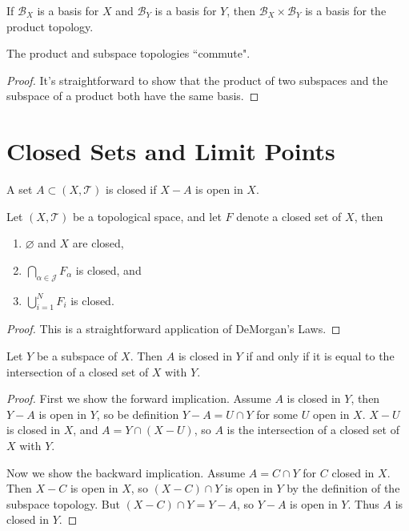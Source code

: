 \documentclass[10pt]{report}
\begin{document}
\begin{prop}
If $\mathcal{B}_X$ is a basis for $X$ and $\mathcal{B}_Y$ is a basis for $Y$, then $\mathcal{B}_X \times \mathcal{B}_Y$ is a basis for the product topology.
\end{prop}

\begin{prop}
	The product and subspace topologies ``commute".
\end{prop}
\begin{proof}
	It's straightforward to show that the product of two subspaces and the subspace of a product both have the same basis.
\end{proof}



\section{Closed Sets and Limit Points}

\begin{defn}
	A set $A \subset (X, \mathcal{T})$ is closed if $X-A$ is open in $X$.
\end{defn}

\begin{thrm}
	Let $(X, \mathcal{T})$ be a topological space, and let $F$ denote a closed set of $X$, then
	\begin{enumerate}
		\item $\varnothing$ and $X$ are closed,
		\item $\bigcap_{\alpha\in\mathcal{J}}F_\alpha$ is closed, and
		\item $\bigcup_{i=1}^N F_i$ is closed.
	\end{enumerate}
\end{thrm}
\begin{proof}
This is a straightforward application of DeMorgan's Laws.
\end{proof}

\begin{prop}
	\label{closed-isct}
Let $Y$ be a subspace of $X$. Then $A$ is closed in $Y$ if and only if it is equal to the intersection of a closed set of $X$ with $Y$.
\end{prop}
\begin{proof}
	First we show the forward implication. Assume $A$ is closed in $Y$, then $Y-A$ is open in $Y$, so be definition $Y-A=U \cap Y$ for some $U$ open in $X$. $X-U$ is closed in $X$, and $A = Y \cap (X-U)$, so $A$ is the intersection of a closed set of $X$ with $Y$.

	Now we show the backward implication. Assume $A = C \cap Y$ for $C$ closed in $X$. Then $X-C$ is open in $X$, so $(X-C) \cap Y$ is open in $Y$ by the definition of the subspace topology. But $(X-C) \cap Y = Y-A$, so $Y-A$ is open in $Y$. Thus $A$ is closed in $Y$.
\end{proof}
\end{document}
